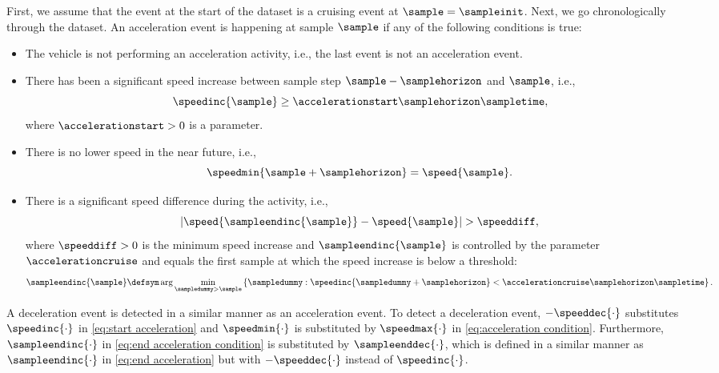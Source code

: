First, we assume that the event at the start of the dataset is a cruising event at $\sample=\sampleinit$. Next, we go chronologically through the dataset. An acceleration event is happening at sample $\sample$ if any of the following conditions is true:
\begin{itemize}
	\item The vehicle is not performing an acceleration activity, i.e., the last event is not an acceleration event.
	\item \cstarta There has been a significant speed increase between sample step $\sample-\samplehorizon$ and $\sample$, i.e., 
	\begin{equation}
		\label{eq:start acceleration}
		\speedinc{\sample} \geq \accelerationstart\samplehorizon\sampletime,
	\end{equation} \cenda
	where $\accelerationstart>0$ is a parameter.
	\item There is no lower speed in the near future, i.e.,
	\begin{equation}
		\label{eq:acceleration condition}
		\speedmin{\sample+\samplehorizon}=\speed{\sample}.
	\end{equation}
	\item There is a significant speed difference during the activity, i.e., 
	\begin{equation}
		\label{eq:end acceleration condition}
		\left|\speed{\sampleendinc{\sample}} - \speed{\sample}\right| > \speeddiff,
	\end{equation}
	where \cstartc $\speeddiff>0$ is the minimum speed increase and \cendc $\sampleendinc{\sample}$ is controlled by the parameter $\accelerationcruise$ and \cstarta equals the first sample at which the speed increase is below a threshold\cenda:
	\begin{equation}
		\label{eq:end acceleration}
		\sampleendinc{\sample} \defsym \arg \min_{\sampledummy > \sample} \left\{ \sampledummy: \speedinc{\sampledummy+\samplehorizon} < \accelerationcruise\samplehorizon\sampletime \right\}.
	\end{equation}
\end{itemize}

\cstartd
A deceleration event is detected in a similar manner as an acceleration event. To detect a deceleration event, $-\speeddec{\cdot}$ substitutes $\speedinc{\cdot}$ in \cref{eq:start acceleration} and $\speedmin{\cdot}$ is substituted by $\speedmax{\cdot}$ in \cref{eq:acceleration condition}. Furthermore, $\sampleendinc{\cdot}$ in \cref{eq:end acceleration condition} is substituted by $\sampleenddec{\cdot}$, which is defined in a similar manner as $\sampleendinc{\cdot}$ in \cref{eq:end acceleration} but with $-\speeddec{\cdot}$ instead of $\speedinc{\cdot}$.\cendd

